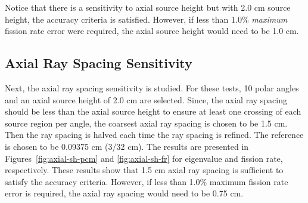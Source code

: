 Notice that there is a sensitivity to axial source height but with 2.0 cm source height, the accuracy criteria is satisfied. However, if less than 1.0\% \textit{maximum} fission rate error were required, the axial source height would need to be 1.0 cm.

\subsection{Axial Ray Spacing Sensitivity}
\label{sec:axial-ray-spacing-sensitivity}

Next, the axial ray spacing sensitivity is studied. For these tests, 10 polar angles and an axial source height of 2.0 cm are selected. Since, the axial ray spacing should be less than the axial source height to ensure at least one crossing of each source region per angle, the coarsest axial ray spacing is chosen to be 1.5 cm. Then the ray spacing is halved each time the ray spacing is refined. The reference is chosen to be 0.09375 cm (3/32 cm). The results are presented in Figures~\ref{fig:axial-sh-pcm} and \ref{fig:axial-sh-fr} for eigenvalue and fission rate, respectively. These results show that 1.5 cm axial ray spacing is sufficient to satisfy the accuracy criteria. However, if less than 1.0\% maximum fission rate error is required, the axial ray spacing would need to be 0.75 cm.


